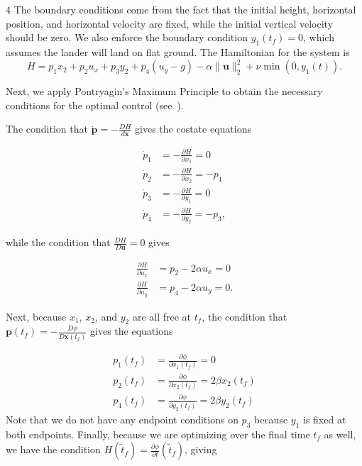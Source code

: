 \documentclass[a0]{4by3}
\newcommand{\NumColumns}{4}
\begin{document}
\begin{minipage}{\linewidth + 2\fboxsep}
\begin{multicols*}{\NumColumns}
The boundary conditions come from the fact that the initial height, horizontal position, and horizontal velocity are fixed, while the initial vertical velocity should be zero. We also enforce the boundary condition $y_1(t_f) = 0$, which assumes the lander will land on flat ground. The Hamiltonian for the system is
\[
H = p_1 x_2 + p_2 u_x + p_3 y_2 + p_4(u_y - g) - \alpha \|\mathbf{u}\|_2^2 + \nu\min(0, y_1(t)).
\]

Next, we apply Pontryagin's Maximum Principle to obtain the necessary conditions for the optimal control (see~\cite{vol4}).

The condition that $\dot{\mathbf{p}}= -\frac{D H}{d \mathbf{x}}$ gives the costate equations

\begin{align*}
    \dot{p}_1 &= -\frac{\partial H}{\partial x_1} = 0 \\[1ex]
    \dot{p}_2 &= -\frac{\partial H}{\partial x_2} = -p_1 \\[1ex]
    \dot{p}_3 &= -\frac{\partial H}{\partial y_1} = 0 \\[1ex]
    \dot{p}_4 &= -\frac{\partial H}{\partial y_2} = -p_3,
\end{align*}

while the condition that $\frac{D H}{D \mathbf{u}} = 0$ gives

\begin{align*}
    \frac{\partial H}{\partial u_x} &= p_2 - 2 \alpha u_x = 0 \\[1ex]
    \frac{\partial H}{\partial u_y} &= p_4 - 2 \alpha u_y = 0.
\end{align*}

Next, because $x_1$, $x_2$, and $y_2$ are all free at $t_f$, the condition that $\mathbf{p}(t_f)= -\frac{D \phi }{D\mathbf{x}(t_f)}$ gives the equations

\begin{align*}
    p_1(t_f) &= \frac{\partial \phi }{\partial x_1(t_f)} = 0 \\[1ex]
    p_2(t_f) &= \frac{\partial \phi }{\partial x_2(t_f)} = 2\beta x_2(t_f) \\[1ex]
    p_4(t_f) &= \frac{\partial \phi }{\partial y_2(t_f)} = 2\beta y_2(t_f)
\end{align*}
Note that we do not have any endpoint conditions on $p_3$ because $y_1$ is fixed at both endpoints.
Finally, because we are optimizing over the final time $t_f$ as well, we have the condition $H(\tilde{t}_f) = \frac{\partial \phi }{\partial t}(\tilde{t}_f)$, giving


\end{multicols*}
\end{minipage}
\end{document}
